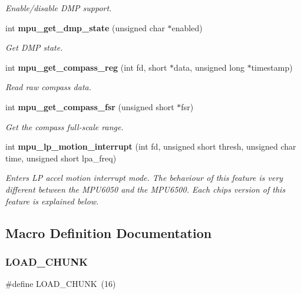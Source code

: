 \begin{DoxyCompactItemize}
\begin{DoxyCompactList}\small\item\em Enable/disable D\+MP support. \end{DoxyCompactList}\item 
int \textbf{ mpu\+\_\+get\+\_\+dmp\+\_\+state} (unsigned char $\ast$enabled)
\begin{DoxyCompactList}\small\item\em Get D\+MP state. \end{DoxyCompactList}\item 
int \textbf{ mpu\+\_\+get\+\_\+compass\+\_\+reg} (int fd, short $\ast$data, unsigned long $\ast$timestamp)
\begin{DoxyCompactList}\small\item\em Read raw compass data. \end{DoxyCompactList}\item 
int \textbf{ mpu\+\_\+get\+\_\+compass\+\_\+fsr} (unsigned short $\ast$fsr)
\begin{DoxyCompactList}\small\item\em Get the compass full-\/scale range. \end{DoxyCompactList}\item 
int \textbf{ mpu\+\_\+lp\+\_\+motion\+\_\+interrupt} (int fd, unsigned short thresh, unsigned char time, unsigned short lpa\+\_\+freq)
\begin{DoxyCompactList}\small\item\em Enters LP accel motion interrupt mode. The behaviour of this feature is very different between the M\+P\+U6050 and the M\+P\+U6500. Each chip\textquotesingle{}s version of this feature is explained below. \end{DoxyCompactList}\end{DoxyCompactItemize}


\subsection{Macro Definition Documentation}
\mbox{\label{mpu_8c_a7750730ae7e5c713b619e347d44185fe}} 
\subsubsection{L\+O\+A\+D\+\_\+\+C\+H\+U\+NK}
{\footnotesize\ttfamily \#define L\+O\+A\+D\+\_\+\+C\+H\+U\+NK~(16)}

